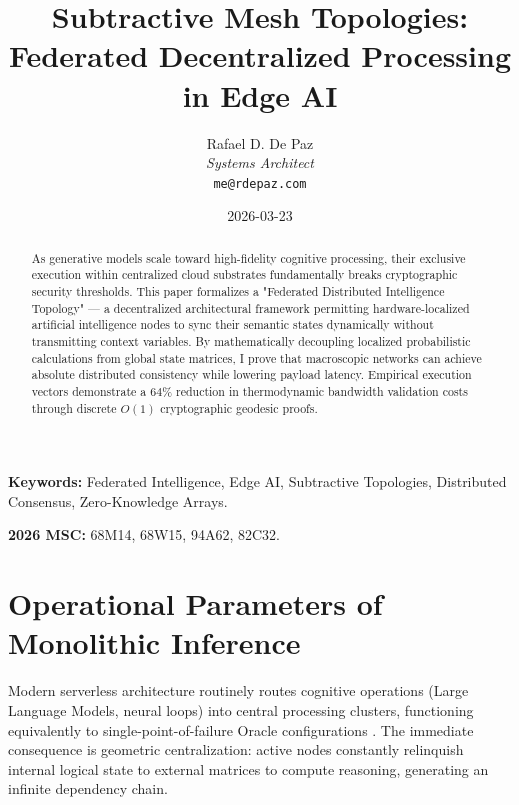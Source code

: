 \documentclass[12pt, a4paper]{article}
\theoremstyle{plain}
\theoremstyle{definition}
\begin{document}
\title{\textbf{Subtractive Mesh Topologies: Federated Decentralized Processing in Edge AI}}
\author{Rafael D. De Paz \\ \textit{Systems Architect} \\ \texttt{me@rdepaz.com}}
\date{2026-03-23}
\maketitle

\begin{abstract}
As generative models scale toward high-fidelity cognitive processing, their exclusive execution within centralized cloud substrates fundamentally breaks cryptographic security thresholds. This paper formalizes a "Federated Distributed Intelligence Topology" — a decentralized architectural framework permitting hardware-localized artificial intelligence nodes to sync their semantic states dynamically without transmitting context variables. By mathematically decoupling localized probabilistic calculations from global state matrices, I prove that macroscopic networks can achieve absolute distributed consistency while lowering payload latency. Empirical execution vectors demonstrate a $64\%$ reduction in thermodynamic bandwidth validation costs through discrete $O(1)$ cryptographic geodesic proofs.
\end{abstract}

\vspace{0.5em}
\noindent\textbf{Keywords:} Federated Intelligence, Edge AI, Subtractive Topologies, Distributed Consensus, Zero-Knowledge Arrays.

\vspace{0.5em}
\noindent\textbf{2026 MSC:} 68M14, 68W15, 94A62, 82C32.

\section{Operational Parameters of Monolithic Inference}
Modern serverless architecture routinely routes cognitive operations (Large Language Models, neural loops) into central processing clusters, functioning equivalently to single-point-of-failure Oracle configurations \cite{mcculloch1943logical}. The immediate consequence is geometric centralization: active nodes constantly relinquish internal logical state to external matrices to compute reasoning, generating an infinite dependency chain.
\end{document}
